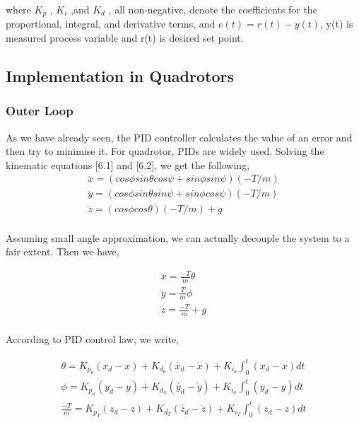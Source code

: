 	where $K_p$ , $K_i$ ,and $K_d$ , all non-negative, denote the coefficients for the proportional, integral, and derivative terms, and $e(t) = r(t)-$$y(t)$, y(t) is measured process variable and r(t) is desired set point.
	
	
	
	\subsection{Implementation in Quadrotors}
	\label{sec:Implementation in Quadrotors}
	
	\subsubsection{Outer Loop}
	
	As we have already seen, the PID controller calculates the value of an error and then try to minimise it. For quadrotor, PIDs are widely used. Solving the kinematic equations [6.1] and [6.2], we get the following,	
	\begin{equation}
	\begin{aligned}
	\ddot{x} = (cos\phi sin\theta cos\psi + sin\phi sin\psi)(-T/m) \\
	\ddot{y} = (cos\phi sin\theta sin\psi + sin\phi cos\psi)(-T/m) \\
	\ddot{z} = (cos\phi cos\theta)(-T/m) + g	\\
	\end{aligned}
	\end{equation}
	
	Assuming small angle approximation, we can actually decouple the system
	to a fair extent. Then we have,
	
	\begin{equation}
	\begin{aligned}
	\ddot{x} = \frac{-T}{m}\theta \\
	\ddot{y} = \frac{T}{m}\phi \\
	\ddot{z} = \frac{-T}{m} + g \\
	\end{aligned}
	\end{equation}
	
	According to PID control law, we write,
	
	\begin{equation}
	\begin{aligned}
	\theta = K_{p_\theta}(x_d - x) + K_{d_\theta}(\dot{x_d} - \dot{x}) + K_{i_\theta} \int_{0}^{t} (x_d - x) dt \\
	\phi = K_{p_\phi}(y_d - y) + K_{d_\phi}(\dot{y_d} - \dot{y}) + K_{i_\phi}\int_{0}^{t} (y_d - y) dt \\
	\frac{-T}{m} = K_{p_T}(z_d - z) + K_{d_T}(\dot{z_d} - \dot{z}) + K_{i_T}\int_{0}^{t} (z_d - z) dt \\
	\end{aligned}
	\end{equation}
	
